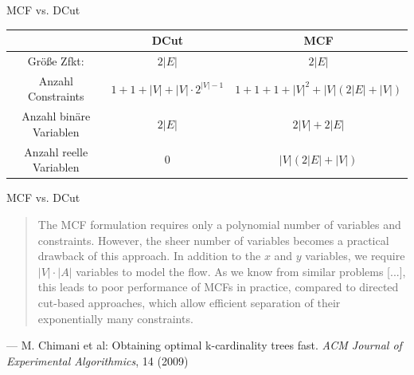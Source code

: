\documentclass[ngerman,aspectratio=169,10pt]{beamer}
\begin{document}
\begin{frame}{MCF vs. DCut}
\begin{tabular}{c|c|c}\hline
   & DCut  & MCF \\\hline
Größe Zfkt: & $2|E|$ & $2|E|$ \\\hline
Anzahl Constraints & $1+1+|V|+|V|\cdot2^{|V|-1}$ & $1+1+1+|V|^2+|V|(2|E|+|V|)$ \\\hline
Anzahl binäre Variablen & $2|E|$ & $2|V|+2|E|$ \\\hline
Anzahl reelle Variablen & $0$ & $|V|(2|E|+|V|)$\\\hline
\end{tabular}
\end{frame}

\begin{frame}{MCF vs. DCut}
\begin{quote}
The MCF formulation requires only a polynomial number of variables and constraints. However, the sheer number of variables becomes a practical drawback of this approach. In addition to the $x$ and $y$ variables, we require $|V|\cdot|A|$ variables to model the flow. As we know from similar problems [...], this leads to poor performance of MCFs in practice, compared to directed cut-based approaches, which allow efficient separation of their exponentially many constraints.
\end{quote}
\begin{flushright}
--- M. Chimani et al: Obtaining optimal k-cardinality trees fast. \textit{ACM Journal of Experimental Algorithmics}, 14 (2009)
\end{flushright}
\end{frame}
\end{document}
